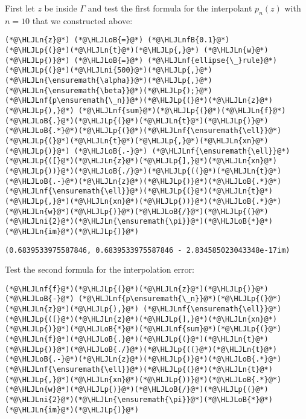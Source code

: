 \documentclass[12pt,a4paper]{article}
\newcommand{\HLJLn}[1]{#1}
\newcommand{\HLJLnf}[1]{\textcolor[RGB]{66,102,213}{#1}}
\newcommand{\HLJLnfB}[1]{\textcolor[RGB]{59,151,46}{#1}}
\newcommand{\HLJLni}[1]{\textcolor[RGB]{59,151,46}{#1}}
\newcommand{\HLJLoB}[1]{\textcolor[RGB]{102,102,102}{\textbf{#1}}}
\newcommand{\HLJLp}[1]{#1}
\begin{document}
First let $z$ be inside $\Gamma$ and test the first formula for the interpolant $p_{n}(z)$ with $n = 10$ that we constructed above:


\begin{lstlisting}
(*@\HLJLn{z}@*) (*@\HLJLoB{=}@*) (*@\HLJLnfB{0.1}@*)
(*@\HLJLp{(}@*)(*@\HLJLn{t}@*)(*@\HLJLp{,}@*) (*@\HLJLn{w}@*)(*@\HLJLp{)}@*) (*@\HLJLoB{=}@*) (*@\HLJLnf{ellipse{\_}rule}@*)(*@\HLJLp{(}@*)(*@\HLJLni{500}@*)(*@\HLJLp{,}@*) (*@\HLJLn{\ensuremath{\alpha}}@*)(*@\HLJLp{,}@*) (*@\HLJLn{\ensuremath{\beta}}@*)(*@\HLJLp{);}@*)
(*@\HLJLnf{p\ensuremath{\_n}}@*)(*@\HLJLp{(}@*)(*@\HLJLn{z}@*)(*@\HLJLp{),}@*) (*@\HLJLnf{sum}@*)(*@\HLJLp{(}@*)(*@\HLJLn{f}@*)(*@\HLJLoB{.}@*)(*@\HLJLp{(}@*)(*@\HLJLn{t}@*)(*@\HLJLp{)}@*)(*@\HLJLoB{.*}@*)(*@\HLJLp{(}@*)(*@\HLJLnf{\ensuremath{\ell}}@*)(*@\HLJLp{(}@*)(*@\HLJLn{t}@*)(*@\HLJLp{,}@*)(*@\HLJLn{xn}@*)(*@\HLJLp{)}@*) (*@\HLJLoB{.-}@*) (*@\HLJLnf{\ensuremath{\ell}}@*)(*@\HLJLp{([}@*)(*@\HLJLn{z}@*)(*@\HLJLp{],}@*)(*@\HLJLn{xn}@*)(*@\HLJLp{))}@*)(*@\HLJLoB{./}@*)(*@\HLJLp{((}@*)(*@\HLJLn{t}@*)(*@\HLJLoB{.-}@*)(*@\HLJLn{z}@*)(*@\HLJLp{)}@*)(*@\HLJLoB{.*}@*)(*@\HLJLnf{\ensuremath{\ell}}@*)(*@\HLJLp{(}@*)(*@\HLJLn{t}@*)(*@\HLJLp{,}@*)(*@\HLJLn{xn}@*)(*@\HLJLp{))}@*)(*@\HLJLoB{.*}@*)(*@\HLJLn{w}@*)(*@\HLJLp{)}@*)(*@\HLJLoB{/}@*)(*@\HLJLp{(}@*)(*@\HLJLni{2}@*)(*@\HLJLn{\ensuremath{\pi}}@*)(*@\HLJLoB{*}@*)(*@\HLJLn{im}@*)(*@\HLJLp{)}@*)
\end{lstlisting}

\begin{lstlisting}
(0.6839533975587846, 0.6839533975587846 - 2.834585023043348e-17im)
\end{lstlisting}


Test the second formula for the interpolation error:


\begin{lstlisting}
(*@\HLJLnf{f}@*)(*@\HLJLp{(}@*)(*@\HLJLn{z}@*)(*@\HLJLp{)}@*) (*@\HLJLoB{-}@*) (*@\HLJLnf{p\ensuremath{\_n}}@*)(*@\HLJLp{(}@*)(*@\HLJLn{z}@*)(*@\HLJLp{),}@*) (*@\HLJLnf{\ensuremath{\ell}}@*)(*@\HLJLp{([}@*)(*@\HLJLn{z}@*)(*@\HLJLp{],}@*)(*@\HLJLn{xn}@*)(*@\HLJLp{)}@*)(*@\HLJLoB{*}@*)(*@\HLJLnf{sum}@*)(*@\HLJLp{(}@*)(*@\HLJLn{f}@*)(*@\HLJLoB{.}@*)(*@\HLJLp{(}@*)(*@\HLJLn{t}@*)(*@\HLJLp{)}@*)(*@\HLJLoB{./}@*)(*@\HLJLp{((}@*)(*@\HLJLn{t}@*)(*@\HLJLoB{.-}@*)(*@\HLJLn{z}@*)(*@\HLJLp{)}@*)(*@\HLJLoB{.*}@*)(*@\HLJLnf{\ensuremath{\ell}}@*)(*@\HLJLp{(}@*)(*@\HLJLn{t}@*)(*@\HLJLp{,}@*)(*@\HLJLn{xn}@*)(*@\HLJLp{))}@*)(*@\HLJLoB{.*}@*)(*@\HLJLn{w}@*)(*@\HLJLp{)}@*)(*@\HLJLoB{/}@*)(*@\HLJLp{(}@*)(*@\HLJLni{2}@*)(*@\HLJLn{\ensuremath{\pi}}@*)(*@\HLJLoB{*}@*)(*@\HLJLn{im}@*)(*@\HLJLp{)}@*)
\end{lstlisting}
\end{document}
